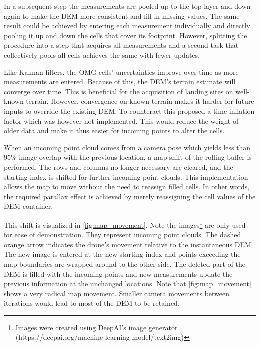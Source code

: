 In a subsequent step the measurements are pooled up to the top layer and down again to make the DEM more consistent and fill in missing values. The same result could be achieved by entering each measurement individually and directly pooling it up and down the cells that cover its footprint. However, splitting the procedure into a step that acquires all measurements and a second task that collectively pools all cells achieves the same with fewer updates.

Like Kalman filters, the OMG cells' uncertainties improve over time as more measurements are entered. Because of this, the DEM's terrain estimate will converge over time. This is beneficial for the acquisition of landing sites on well-known terrain. However, convergence on known terrain makes it harder for future inputs to override the existing DEM. To counteract this \citet{LSD2} proposed a time inflation factor which was however not implemented. This would reduce the weight of older data and make it thus easier for incoming points to alter the cells.

When an incoming point cloud comes from a camera pose which yields less than 95\%  image overlap with the previous location, a map shift of the rolling buffer is performed. The rows and columns no longer necessary are cleared, and the starting index is shifted for further incoming point clouds. This implementation allows the map to move without the need to reassign filled cells. In other words, the required parallax effect is achieved by merely reassigning the cell values of the DEM container.

This shift is visualized in \cref{fig:map_movement}. Note the images\footnote[1]{Images were created using DeepAI's image generator (https://deepai.org/machine-learning-model/text2img)} are only used for ease of demonstration. They represent incoming point clouds. The dashed orange arrow indicates the drone's movement relative to the instantaneous DEM. The new image is entered at the new starting index and points exceeding the map boundaries are wrapped around to the other side. The deleted part of the DEM is filled with the incoming points and new measurements update the previous information at the unchanged locations. Note that \cref{fig:map_movement} shows a very radical map movement. Smaller camera movements between iterations would lead to most of the DEM to be retained.

